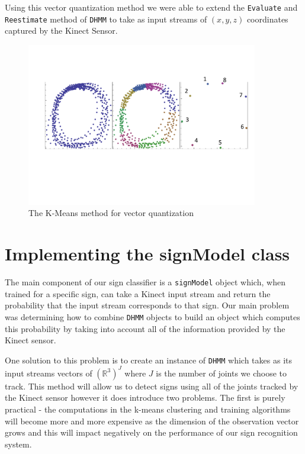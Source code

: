 Using this vector quantization method we were able to extend the \verb|Evaluate| and \verb|Reestimate| method of \verb|DHMM| to take as input streams of $(x,y,z)$ coordinates captured by the Kinect Sensor.

\begin{figure}[h!]
        \centering
        \includegraphics[width=0.9\textwidth]{ThesisFigs/ClusteringDiag}
        \caption{The K-Means method for vector quantization}\label{fig:kmeans}
\end{figure}

\section{Implementing the signModel class}
The main component of our sign classifier is a \verb|signModel| object which, when trained for a specific sign, can take a Kinect input stream and return the probability that the input stream corresponds to that sign. Our main problem was determining how to combine \verb|DHMM| objects to build an object which computes this probability by taking into account all of the information provided by the Kinect sensor.

One solution to this problem is to create an instance of \verb|DHMM| which takes as its input streams vectors of $(\mathbb{R}^3)^J$ where $J$ is the number of joints we choose to track. This method will allow us to detect signs using all of the joints tracked by the Kinect sensor however it does introduce two problems. The first is purely practical - the computations in the k-means clustering and training algorithms will become more and more expensive as the dimension of the observation vector grows and this will impact negatively on the performance of our sign recognition system.

